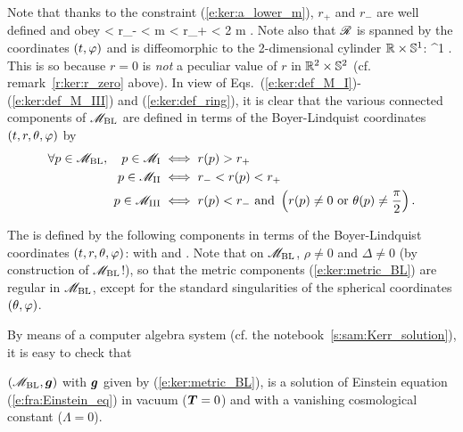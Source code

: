 Note that thanks to the constraint (\ref{e:ker:a_lower_m}), $r_+$ and $r_-$
are well defined and obey
 < r_- < m < r_+ < 2 m .
\ee
Note also that $\mathscr{R}$ is spanned by the coordinates $(t,\varphi)$ and is diffeomorphic to the 2-dimensional cylinder $\mathbb{R}\times\mathbb{S}^1$:
\be \label{e:ker:ring_R_S1}
    \ring \simeq \R\times\SS^1 .
\ee
This is so because $r=0$ is \emph{not} a peculiar value of $r$ in $\mathbb{R}^2\times\mathbb{S}^2$
(cf. remark~\ref{r:ker:r_zero} above).
In view of Eqs.~(\ref{e:ker:def_M_I})-(\ref{e:ker:def_M_III}) and (\ref{e:ker:def_ring}), it is clear that
the various connected components of $\mathscr{M}_{\rm BL}$ are defined in terms of the
Boyer-Lindquist coordinates $(t,r,\theta,\varphi)$ by
\begin{subequations}
\label{e:ker:M_I_III_r}
\begin{align}
  \forall p \in  \mathscr{M}_{\rm BL},\quad p \in \mathscr{M}_{\rm I} & \iff r(p) > r_+ \\
    \quad p \in \mathscr{M}_{\rm II} & \iff r_- < r(p) < r_+ \\
    \quad p \in \mathscr{M}_{\rm III} & \iff r(p) < r_-\ \mbox{and}\
    \left( r(p) \not=0 \ \mbox{or}\ \theta(p) \not=\frac{\pi}{2} \right) .
\end{align}
\end{subequations}


The  is defined by the following
components in terms of the Boyer-Lindquist coordinates $(t,r,\theta,\varphi)$:
\be \label{e:ker:metric_BL}
\ee
with
\be \label{e:ker:def_rho2}
\ee
and
\be \label{e:ker:def_Delta}
     .
\ee
Note that on $\mathscr{M}_{\rm BL}$, $\rho\not=0$ and $\Delta\not=0$ (by construction
of $\mathscr{M}_{\rm BL}$!), so that the metric components (\ref{e:ker:metric_BL})
are regular in $\mathscr{M}_{\rm BL}$, except for the standard singularities of
the spherical coordinates $(\theta,\varphi)$.

By means of a computer algebra system (cf. the notebook~\ref{s:sam:Kerr_solution}),
it is easy to check that
\begin{greybox}
$\left(\mathscr{M}_{\rm BL},\bm{g}\right)$ with $\bm{g}$ given
by (\ref{e:ker:metric_BL}), is a solution of Einstein equation
(\ref{e:fra:Einstein_eq})
in vacuum ($\bm{T}=0$) and with a vanishing cosmological constant ($\Lambda=0$).
\end{greybox}

